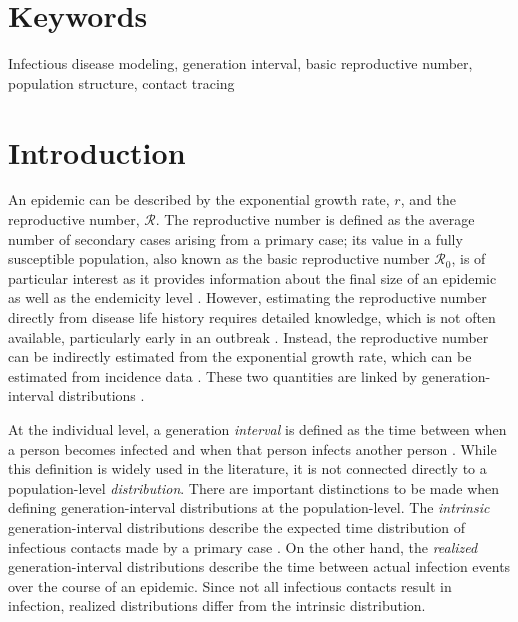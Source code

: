 \documentclass[12pt]{article}
\newcommand{\Rx}[1]{\ensuremath{{\mathcal R}_{#1}}\xspace}
\newcommand{\Ro}{\Rx{0}}
\newcommand{\RR}{\ensuremath{{\mathcal R}}}
\begin{document}
\section*{Keywords}

Infectious disease modeling, generation interval, basic reproductive number, population structure, contact tracing

\pagebreak

\section{Introduction}

An epidemic can be described by the exponential growth rate, $r$, and the reproductive number, \RR.
The reproductive number is defined as the average number of secondary cases arising from a primary case;
its value in a fully susceptible population, also known as the basic reproductive number \Ro, is of particular interest as it provides information about the final size of an epidemic \citep{anderson1991infectious, diekmann1990definition} as well as the endemicity level \citep{kribs2000simple, van2002reproduction, smith2012ross}.
However, estimating the reproductive number directly from disease life history requires detailed knowledge, which is not often available, particularly early in an outbreak \citep{dietz1993estimation}.
Instead, the reproductive number can be indirectly estimated from the exponential growth rate, which can be estimated from incidence data \citep{chowell2003sars, mills2004transmissibility, nishiura2009transmission, nishiura2010pros, ma2014estimating}.
These two quantities are linked by generation-interval distributions \citep{wearing2005appropriate, svensson2007note, roberts2007model, wallinga2007generation, park2019practical}.

At the individual level, a generation \emph{interval} is defined as the time between when a person becomes infected and when that person infects another person \citep{svensson2007note}.
While this definition is widely used in the literature, it is not connected directly to a population-level \emph{distribution}.
There are important distinctions to be made when defining generation-interval distributions at the population-level. The \emph{intrinsic} generation-interval distributions describe the expected time distribution of infectious contacts made by a primary case \citep{champredon2015intrinsic}.
On the other hand, the \emph{realized} generation-interval distributions describe the time between actual infection events over the course of an epidemic.
Since not all infectious contacts result in infection, realized distributions differ from the intrinsic distribution.
\end{document}
